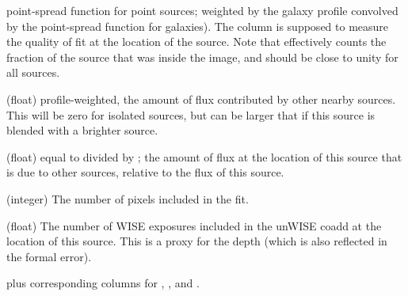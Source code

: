 \documentclass[12pt,preprint]{aastex}
\begin{document}
\begin{description}
  point-spread function for point sources; weighted by the galaxy
  profile convolved by the point-spread function for galaxies).  The
  column  is supposed to measure the quality of
  fit at the location of the source.  Note that 
  effectively counts the fraction of the source that was inside the
  image, and should be close to unity for all sources.
\item[\colname{w1\_proflux}] (float) profile-weighted, the amount of
  flux contributed by other nearby sources.  This will be zero for
  isolated sources, but can be larger that 
  if this source is blended with a brighter source.
\item[\colname{w1\_profracflux}] (float) equal to
   divided by ; the
  amount of flux at the location of this source that is due to other
  sources, relative to the flux of this source.
\item[\colname{w1\_npix}] (integer) The number of pixels included in
  the fit.
\item[\colname{w1\_pronexp}] (float) The number of WISE exposures
  included in the unWISE coadd at the location of this source.  This
  is a proxy for the depth (which is also reflected in the formal
  error).
\end{description}
plus corresponding columns for , , and
.
\end{document}
